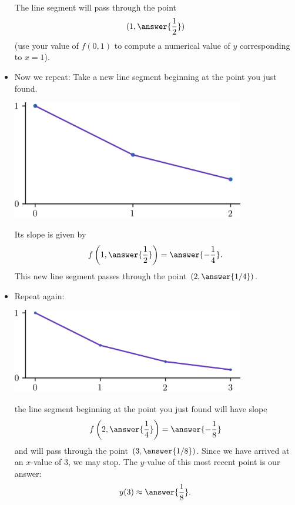 \documentclass{ximera}
\begin{document}
\begin{example}
\begin{itemize}
\begin{center}
\begin{image}
\end{image}
\end{center}
The line segment will pass through the point
\[ (1 , \answer{\frac{1}{2}}) \]
(use your value of $f(0,1)$ to compute a numerical value of $y$ corresponding to $x = 1$).
\item Now we repeat: Take a new line segment beginning at the point you just found. 
\begin{center}
\begin{image}
\includegraphics[width=4in]{images/euler02.png}
\end{image}
\end{center}
Its slope is given by
\[ f \left(1,\answer{\frac{1}{2}} \right)  = \answer{-\frac{1}{4}}. \]
This new line segment passes through the point $(2,\answer{1/4})$.
\item Repeat again: 
\begin{center}
\begin{image}
\includegraphics[width=4in]{images/euler03.png}
\end{image}
\end{center}
the line segment beginning at the point you just found will have slope
\[ f \left(2,\answer{\frac{1}{4}} \right)  = \answer{-\frac{1}{8}} \]
and will pass through the point $(3,\answer{1/8})$. Since we have arrived at an $x$-value of $3$, we may stop. The $y$-value of this most recent point is our answer:
\[ y(3) \approx \answer{\frac{1}{8}}. \]
\end{itemize}
\end{example}
\end{document}

